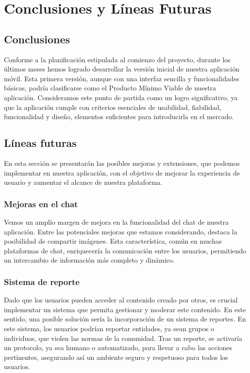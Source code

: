 \chapter{Conclusiones y Líneas Futuras}
    \section{Conclusiones}
        Conforme a la planificación estipulada al comienzo del proyecto, durante los últimos meses hemos logrado desarrollar la versión inicial de nuestra aplicación móvil. Esta primera versión, aunque con una interfaz sencilla y funcionalidades básicas, podría clasificarse como el Producto Mínimo Viable\cite{REF6} de nuestra aplicación. Consideramos este punto de partida como un logro significativo, ya que la aplicación cumple con criterios esenciales de usabilidad, fiabilidad, funcionalidad y diseño, elementos suficientes para introducirla en el mercado.

        \section{Líneas futuras}
            En esta sección se presentarán las posibles mejoras y extensiones, que podemos implementar en nuestra aplicación, con el objetivo de mejorar la experiencia de usuario y aumentar el alcance de nuestra plataforma.
  
        \subsection{Mejoras en el chat}
            Vemos un amplio margen de mejora en la funcionalidad del chat de nuestra aplicación. Entre las potenciales mejoras que estamos considerando, destaca la posibilidad de compartir imágenes. Esta característica, común en muchas plataformas de chat, enriquecería la comunicación entre los usuarios, permitiendo un intercambio de información más completo y dinámico.
            
        \subsection{Sistema de reporte}
            Dado que los usuarios pueden acceder al contenido creado por otros, es crucial implementar un sistema que permita gestionar y moderar este contenido. En este sentido, una posible solución sería la incorporación de un sistema de reportes. En este sistema, los usuarios podrían reportar entidades, ya sean grupos o individuos, que violen las normas de la comunidad. Tras un reporte, se activaría un protocolo, ya sea humano o automatizado, para llevar a cabo las acciones pertinentes, asegurando así un ambiente seguro y respetuoso para todos los usuarios.



